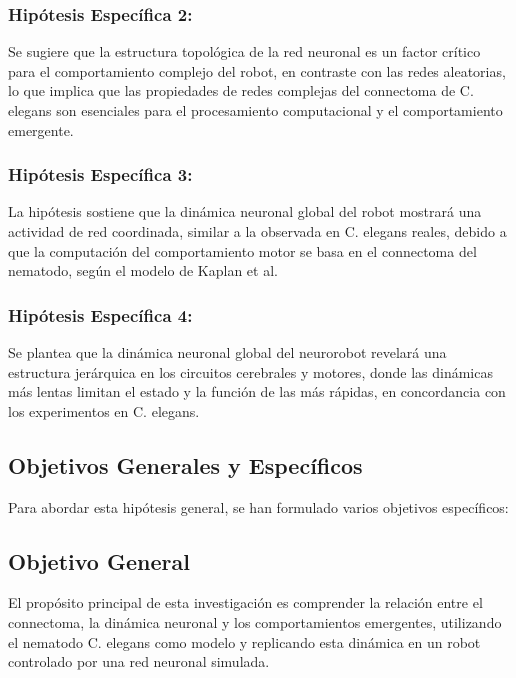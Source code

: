  \subsubsection{Hipótesis Específica 2:}
 
 Se sugiere que la estructura topológica de la red neuronal es un factor crítico para el comportamiento complejo del robot, en contraste con las redes aleatorias, lo que implica que las propiedades de redes complejas del connectoma de C. elegans son esenciales para el procesamiento computacional y el comportamiento emergente.
 
 \subsubsection{Hipótesis Específica 3:}
 
 La hipótesis sostiene que la dinámica neuronal global del robot mostrará una actividad de red coordinada, similar a la observada en C. elegans reales, debido a que la computación del comportamiento motor se basa en el connectoma del nematodo, según el modelo de Kaplan et al. \cite{kaplan_sensorimotor_2018}
 
 \subsubsection{Hipótesis Específica 4:}
 
 Se plantea que la dinámica neuronal global del neurorobot revelará una estructura jerárquica en los circuitos cerebrales y motores, donde las dinámicas más lentas limitan el estado y la función de las más rápidas, en concordancia con los experimentos en C. elegans.
 
 
 \subsection{Objetivos Generales y Específicos}
 
 Para abordar esta hipótesis general, se han formulado varios objetivos específicos:
 
 \subsection{Objetivo General}
 
 El propósito principal de esta investigación es comprender la relación entre el connectoma, la dinámica neuronal y los comportamientos emergentes, utilizando el nematodo C. elegans como modelo y replicando esta dinámica en un robot controlado por una red neuronal simulada.
 
